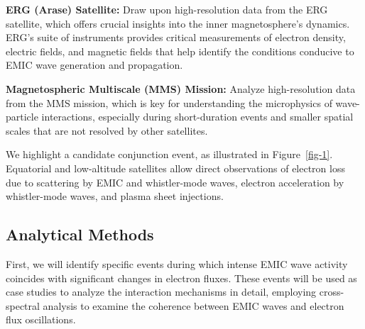 \documentclass[
  letterpaper,
  DIV=11,
  numbers=noendperiod]{scrartcl}
\begin{document}
\textbf{ERG (Arase) Satellite:} Draw upon high-resolution data from the ERG satellite, which offers crucial insights into the inner magnetosphere's dynamics. ERG's suite of instruments provides critical measurements of electron density, electric fields, and magnetic fields that help identify the conditions conducive to EMIC wave generation and propagation.

\textbf{Magnetospheric Multiscale (MMS) Mission:} Analyze high-resolution data from the MMS mission, which is key for understanding the microphysics of wave-particle interactions, especially during short-duration events and smaller spatial scales that are not resolved by other satellites.

We highlight a candidate conjunction event, as illustrated in Figure~\ref{fig-1}. Equatorial and low-altitude satellites allow direct observations of electron loss due to scattering by EMIC and whistler-mode waves, electron acceleration by whistler-mode waves, and plasma sheet injections.

\subsection{Analytical Methods}\label{analytical-methods}

First, we will identify specific events during which intense EMIC wave activity coincides with significant changes in electron fluxes. These events will be used as case studies to analyze the interaction mechanisms in detail, employing cross-spectral analysis to examine the coherence between EMIC waves and electron flux oscillations.
\end{document}
